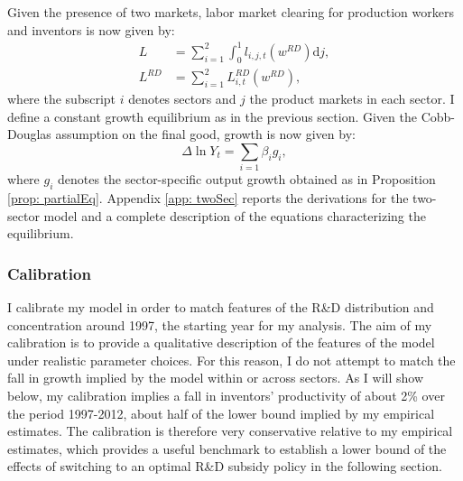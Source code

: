 Given the presence of two markets, labor market clearing for production
workers and inventors is now given by:
\begin{align}
L & =\sum_{i=1}^{2}\int_{0}^{1}l_{i,j,t}\left(w^{RD}\right)\mathrm{d}j,\label{eq: Lprod-1}\\
L^{RD} & =\sum_{i=1}^{2}L_{i,t}^{RD}\left(w^{RD}\right),\label{eq: LRD-1}
\end{align}
where the subscript $i$ denotes sectors and $j$ the product markets
in each sector. I define a constant growth equilibrium as in the previous
section. Given the Cobb-Douglas assumption on the final good, growth
is now given by:
\[
\Delta\ln Y_{t}=\sum_{i=1}\beta_{i}g_{i},
\]
where $g_{i}$ denotes the sector-specific output growth obtained
as in Proposition \ref{prop: partialEq}. Appendix \ref{app: twoSec}
reports the derivations for the two-sector model and a complete description
of the equations characterizing the equilibrium.

\subsubsection{Calibration\label{subsec:Calibration}}

I calibrate my model in order to match features of the R\&D distribution
and concentration around 1997, the starting year for my analysis.
The aim of my calibration is to provide a qualitative description
of the features of the model under realistic parameter choices. For
this reason, I do not attempt to match the fall in growth implied
by the model within or across sectors. As I will show below, my calibration
implies a fall in inventors' productivity of about 2\% over the period
1997-2012, about half of the lower bound implied by my empirical estimates.
The calibration is therefore very conservative relative to my empirical
estimates, which provides a useful benchmark to establish a lower
bound of the effects of switching to an optimal R\&D subsidy policy
in the following section. 


